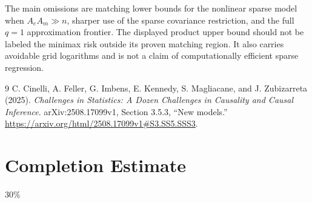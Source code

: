 \documentclass[11pt,a4paper]{article}
\theoremstyle{definition}
\theoremstyle{remark}
\begin{document}
The main omissions are matching lower bounds for the nonlinear sparse model when $A_eA_m\gg n$, sharper use of the sparse covariance restriction, and the full $q=1$ approximation frontier. The displayed product upper bound should not be labeled the minimax risk outside its proven matching region. It also carries avoidable grid logarithms and is not a claim of computationally efficient sparse regression.
\begin{thebibliography}{9}
 C. Cinelli, A. Feller, G. Imbens, E. Kennedy, S. Magliacane, and J. Zubizarreta (2025).
\emph{Challenges in Statistics: A Dozen Challenges in Causality and Causal Inference}. arXiv:2508.17099v1, Section 3.5.3, ``New models.''
\url{https://arxiv.org/html/2508.17099v1#S3.SS5.SSS3}.
\end{thebibliography}

\section{Completion Estimate}
30\%
\end{document}
